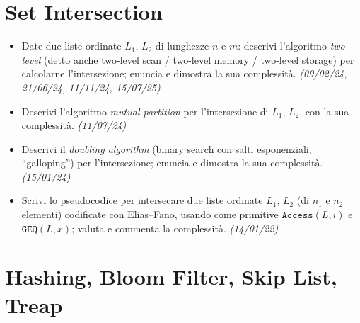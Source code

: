 \section{Set Intersection}

\begin{itemize}[leftmargin=1.4em]
\item {}\hot Date due liste ordinate $L_1$, $L_2$ di lunghezze $n$ e $m$: descrivi l'algoritmo
\emph{two-level} (detto anche two-level scan / two-level memory / two-level storage) per calcolarne
l'intersezione; enuncia e dimostra la sua complessit\`a. \emph{(09/02/24, 21/06/24, 11/11/24, 15/07/25)}
\item {} Descrivi l'algoritmo \emph{mutual partition} per l'intersezione di $L_1$, $L_2$,
con la sua complessit\`a. \emph{(11/07/24)}
\item {} Descrivi il \emph{doubling algorithm} (binary search con salti esponenziali,
``galloping'') per l'intersezione; enuncia e dimostra la sua complessit\`a. \emph{(15/01/24)}
\item {} Scrivi lo pseudocodice per intersecare due liste ordinate $L_1$, $L_2$ (di $n_1$ e
$n_2$ elementi) codificate con Elias--Fano, usando come primitive $\texttt{Access}(L,i)$ e
$\texttt{GEQ}(L,x)$; valuta e commenta la complessit\`a. \emph{(14/01/22)}
\end{itemize}

\section{Hashing, Bloom Filter, Skip List, Treap}

